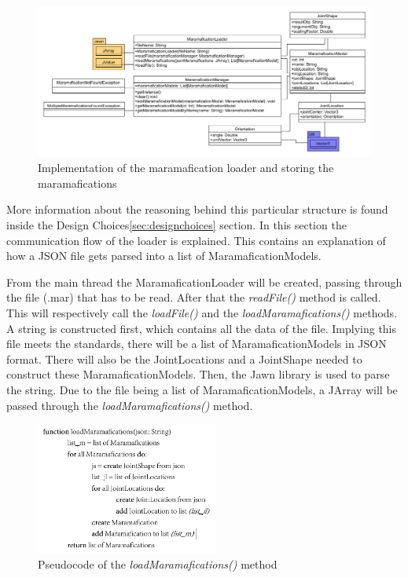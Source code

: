 \documentclass[10pt]{extarticle} %
\begin{document}
    \begin{figure}[htb]
        \centering
        \includegraphics[width=\textwidth, height=\textheight, keepaspectratio]{Marama-Editor}
        \caption{Implementation of the maramafication loader and storing the maramafications}
    \end{figure}
    More information about the reasoning behind this particular structure is found inside the Design Choices\ref{sec:designchoices} section.
    In this section the communication flow of the loader is explained.
    This contains an explanation of how a JSON file gets parsed into a list of MaramaficationModels.

    From the main thread the MaramaficationLoader will be created, passing through the file (.mar) that has to be read.
    After that the \textit{readFile()} method is called.
    This will respectively call the \textit{loadFile()} and the \textit{loadMaramafications()} methods.
    A string is constructed first, which contains all the data of the file.
    Implying this file meets the standards, there will be a list of MaramaficationModels in JSON format.
    There will also be the JointLocations and a JointShape needed to construct these MaramaficationModels.
    Then, the Jawn library is used to parse the string. Due to the file being a list of MaramaficationModels, a JArray will be passed through the \textit{loadMaramafications()} method.
    \newpage
    \begin{figure}[htb]
        \center
        \includegraphics[width=60mm, keepaspectratio]{pseudocode}
        \caption{Pseudocode of the \textit{loadMaramafications()} method}
    \end{figure}
\end{document}
